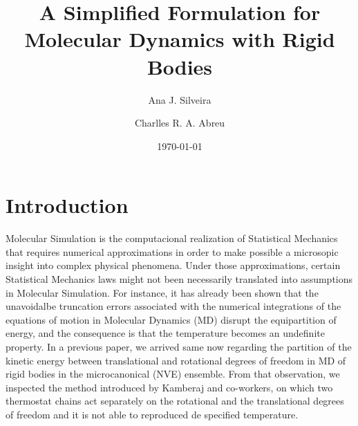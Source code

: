 \documentclass[aip,jcp,reprint,amsmath,amssymb]{revtex4-1}
\begin{document}
\title{A Simplified Formulation for Molecular Dynamics with Rigid Bodies}

\author{Ana J. Silveira}

\author{Charlles R. A. Abreu}

\date{\today}

\begin{abstract}
\end{abstract}

\maketitle

\section{Introduction}

Molecular Simulation is the computacional realization of Statistical Mechanics\cite{Tuckerman2010} that requires numerical approximations in order to make possible a microsopic insight into complex physical phenomena. Under those approximations, certain Statistical Mechanics laws might not been necessarily translated into assumptions in Molecular Simulation. For instance, it has already been shown that the unavoidalbe truncation errors associated with the numerical integrations of the equations of motion in Molecular Dynamics (MD) disrupt the equipartition of energy, and the consequence is that the temperature becomes an undefinite property. In a previous paper,\citep{Abreu_2017} we arrived same now regarding the partition of the kinetic energy between translational and rotational degrees of freedom in MD of rigid bodies in the microcanonical (NVE) ensemble. From that observation, we inspected the method introduced by Kamberaj and co-workers\cite{Kamberaj2005}, on which two thermostat chains act separately on the rotational and the translational degrees of freedom and it is not able to reproduced de specified temperature.
\end{document}
